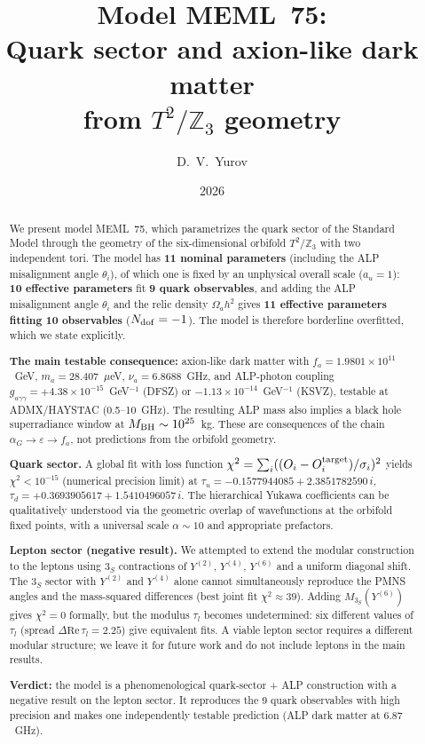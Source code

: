 \documentclass[12pt,a4paper]{article}
\title{\textbf{Model MEML~75:}\\[0.3cm]
\large Quark sector and axion-like dark matter\\
from \(T^2/\mathbb{Z}_3\) geometry}
\author{D.~V.~Yurov}
\date{2026}
\numberwithin{equation}{section}
\begin{document}
\maketitle

\begin{abstract}
\noindent
We present model MEML~75, which parametrizes the quark sector of the
Standard Model through the geometry of the six-dimensional
orbifold \(T^2/\mathbb{Z}_3\) with two independent tori.
The model has \textbf{11 nominal parameters} (including the ALP
misalignment angle \(\theta_i\)), of which one is fixed by an
unphysical overall scale (\(a_u = 1\)): \textbf{10 effective parameters}
fit \textbf{9 quark observables}, and adding the ALP misalignment angle
\(\theta_i\) and the relic density \(\Omega_a h^2\) gives
\textbf{11 effective parameters fitting 10 observables}
(\(N_{\rm dof} = -1\)). The model is therefore borderline overfitted,
which we state explicitly.

\textbf{The main testable consequence:}
axion-like dark matter with
\(f_a = 1.9801\times10^{11}\)~GeV,
\(m_a = 28.407\)~\(\mu\)eV, \(\nu_a = 6.8688\)~GHz, and ALP-photon
coupling
\(g_{a\gamma\gamma} = +4.38\times10^{-15}\)~GeV\(^{-1}\) (DFSZ)
or \(-1.13\times10^{-14}\)~GeV\(^{-1}\) (KSVZ), testable
at ADMX/HAYSTAC (0.5--10~GHz).
The resulting ALP mass also implies a black hole superradiance window at
\(M_{\rm BH} \sim 10^{25}\)~kg.
These are consequences of the chain \(\alpha_G \to \varepsilon \to f_a\),
not predictions from the orbifold geometry.

\textbf{Quark sector.} A global fit with loss function
\(\chi^2 = \sum_i ((O_i-O_i^{\rm target})/\sigma_i)^2\) yields
\(\chi^2 < 10^{-15}\) (numerical precision limit) at
\(\tau_u = -0.1577944085 + 2.3851782590\,i\),
\(\tau_d = +0.3693905617 + 1.5410496057\,i\).
The hierarchical Yukawa coefficients can be qualitatively understood
via the geometric overlap of wavefunctions at the orbifold fixed points,
with a universal scale \(\alpha \sim 10\) and appropriate prefactors.

\textbf{Lepton sector (negative result).} We attempted to extend the
modular construction to the leptons using \(3_S\) contractions of
\(Y^{(2)}\), \(Y^{(4)}\), \(Y^{(6)}\) and a uniform diagonal shift.
The \(3_S\) sector with \(Y^{(2)}\) and \(Y^{(4)}\) alone cannot
simultaneously reproduce the PMNS angles and the mass-squared
differences (best joint fit \(\chi^2 \approx 39\)). Adding
\(M_{3_S}(Y^{(6)})\) gives \(\chi^2 = 0\) formally, but the modulus
\(\tau_l\) becomes undetermined: six different values of
\(\tau_l\) (spread \(\Delta \mathrm{Re}\,\tau_l = 2.25\)) give equivalent
fits. A viable lepton sector requires a different modular structure;
we leave it for future work and do not include leptons in the main
results.

\textbf{Verdict:} the model is a phenomenological quark-sector + ALP
construction with a negative result on the lepton sector. It reproduces
the 9 quark observables with high precision and makes one independently
testable prediction (ALP dark matter at \(6.87\)~GHz).
\end{abstract}
\end{document}
